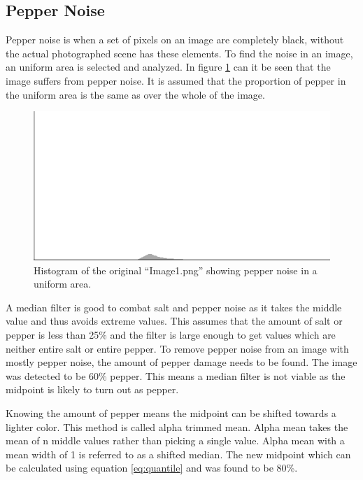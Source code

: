 \subsection{Pepper Noise}\label{image_1}
Pepper noise is when a set of pixels on an image are completely black, without the actual photographed scene has these elements.
To find the noise in an image, an uniform area is selected and analyzed.
In figure \ref{fig:hist_pepper_im01} can it be seen that the image suffers from pepper noise.
It is assumed that the proportion of pepper in the uniform area is the same as over the whole of the image.

\begin{figure}[H]
\centering
\includegraphics[width = \histogramWidth]{graphics/hist1_uniform.png}
\caption{Histogram of the original ``Image1.png'' showing pepper noise in a uniform area.}
\label{fig:hist_pepper_im01}
\end{figure}

A median filter is good to combat salt and pepper noise as it takes the middle value and thus avoids extreme values.
This assumes that the amount of salt or pepper is less than 25\% and the filter is large enough to get values which are neither entire salt or entire pepper.
To remove pepper noise from an image with mostly pepper noise, the amount of pepper damage needs to be found.
The image was detected to be 60\% pepper.
This means a median filter is not viable as the midpoint is likely to turn out as pepper.

Knowing the amount of pepper means the midpoint can be shifted towards a lighter color.
This method is called alpha trimmed mean.
Alpha mean takes the mean of n middle values rather than picking a single value.
Alpha mean with a mean width of 1 is referred to as a shifted median.
The new midpoint which can be calculated using equation \ref{eq:quantile} and was found to be 80\%. 

